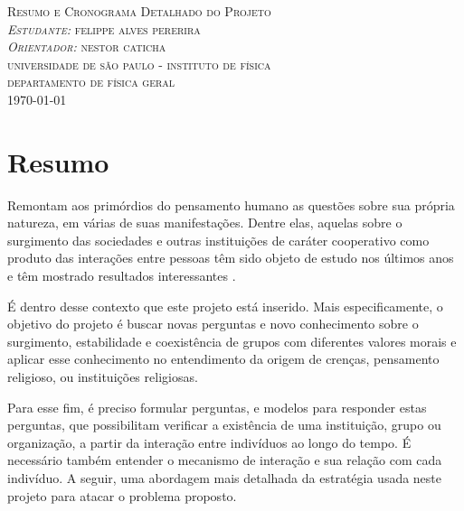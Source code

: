 \documentclass[11pt]{article}
\begin{document}
\begin{titlepage}
\begin{center}
\textsc{\Large Resumo e Cronograma Detalhado do Projeto\\}
\textsc{\small {\it Estudante:} felippe alves pererira\\ {\it Orientador:}
nestor caticha\\}
\textsc{universidade de são paulo - instituto de física}\\
\textsc{\small departamento de física geral}\\
\small \today
\end{center}
\end{titlepage}

\newpage


\newpage\null\thispagestyle{empty}\newpage
\section{Resumo}

Remontam aos primórdios do pensamento humano as questões sobre sua própria
natureza, em várias de suas manifestações. Dentre elas, aquelas sobre
o surgimento das sociedades e outras instituições de caráter cooperativo como
produto das interações entre pessoas têm sido objeto de estudo 
nos últimos anos e têm mostrado resultados interessantes
\cite{CatichaetalA,Schonmannetal2011a,Perreault,Jonatas,visujeca}. 

É dentro desse contexto que este projeto está inserido. Mais especificamente, o
objetivo do projeto é buscar novas perguntas e novo conhecimento sobre o
surgimento, estabilidade e coexistência de grupos com diferentes valores morais
e aplicar esse conhecimento no entendimento
da origem de crenças, pensamento religioso, ou instituições religiosas.

Para esse fim, é preciso formular perguntas, e modelos para responder estas
perguntas, que possibilitam verificar a existência de uma
instituição, grupo ou organização, a partir da interação entre indivíduos ao
longo do tempo. É necessário também entender o mecanismo de interação e
sua relação com cada indivíduo. A seguir, uma abordagem mais detalhada da
estratégia usada neste projeto para atacar o problema proposto.
\end{document}
